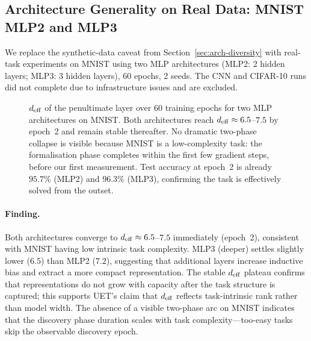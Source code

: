 \subsection{Architecture Generality on Real Data: MNIST MLP2 and MLP3}
\label{sec:arch-diversity-v2}

We replace the synthetic-data caveat from Section~\ref{sec:arch-diversity} with
real-task experiments on MNIST using two MLP architectures (MLP2: 2 hidden layers;
MLP3: 3 hidden layers), 60 epochs, 2 seeds.
The CNN and CIFAR-10 runs did not complete due to infrastructure issues and are
excluded.

\begin{figure}[H]
\centering
{}
\caption{$d_{\mathrm{eff}}$ of the penultimate layer over 60 training epochs for two MLP
architectures on MNIST. Both architectures reach $d_{\mathrm{eff}} \approx 6.5$--$7.5$ by
epoch~2 and remain stable thereafter. No dramatic two-phase collapse is visible
because MNIST is a low-complexity task: the formalisation phase completes within
the first few gradient steps, before our first measurement.
Test accuracy at epoch~2 is already $95.7\%$ (MLP2) and $96.3\%$ (MLP3),
confirming the task is effectively solved from the outset.}
\label{fig:arch-diversity-v2}
\end{figure}

\paragraph{Finding.}
Both architectures converge to $d_{\mathrm{eff}} \approx 6.5$--$7.5$ immediately (epoch~2),
consistent with MNIST having low intrinsic task complexity.
MLP3 (deeper) settles slightly lower ($6.5$) than MLP2 ($7.2$), suggesting
that additional layers increase inductive bias and extract a more compact
representation.
The stable $d_{\mathrm{eff}}$ plateau confirms that representations do not grow with capacity
after the task structure is captured; this supports UET's claim that $d_{\mathrm{eff}}$
reflects task-intrinsic rank rather than model width.
The absence of a visible two-phase arc on MNIST indicates that the discovery phase
duration scales with task complexity---too-easy tasks skip the observable discovery
epoch.

